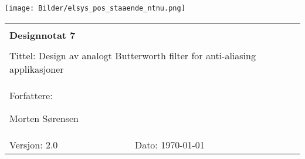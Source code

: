 \topmargin -1.5cm
\begin{minipage}[c]{0.15\textwidth}
\texttt{[image: Bilder/elsys\_pos\_staaende\_ntnu.png]}  
\end{minipage}
\begin{minipage}[c]{0.85\textwidth}

\renewcommand{\arraystretch}{1.7}
\large 
\begin{tabularx}{\textwidth}{|X|X|}
\hline
\multicolumn{2}{|l|}{} \\
\multicolumn{2}{|l|}{\huge \textbf{Designnotat 7}} \\
\multicolumn{2}{|l|}{}  \\
\hline
\multicolumn{2}{|l|}{\parbox[c][1.4cm]{0.9\textwidth}{Tittel: 
Design av analogt Butterworth filter for anti-aliasing applikasjoner
}} \\
\hline
\multicolumn{2}{|l|}{Forfattere: 

Morten Sørensen
} \\
\hline

Versjon: 2.0 & Dato: \today
\\
\hline 
\end{tabularx}
\end{minipage}
\normalsize

